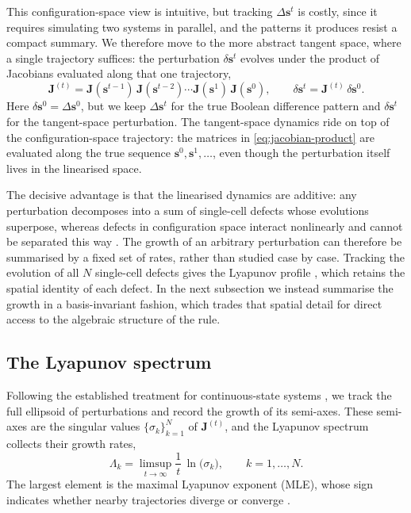 \documentclass[a4paper,fleqn]{cas-dc}
\begin{document}
This configuration-space view is intuitive, but tracking $\Delta\mathbf{s}^t$ is costly, since it requires simulating two systems in parallel, and the patterns it produces resist a compact summary. We therefore move to the more abstract tangent space, where a single trajectory suffices: the perturbation $\delta\mathbf{s}^t$ evolves under the product of Jacobians evaluated along that one trajectory,
\begin{equation}
    \label{eq:jacobian-product}
    \mathbf{J}^{(t)}=\mathbf{J}(\mathbf{s}^{t-1})\,\mathbf{J}(\mathbf{s}^{t-2})
    \cdots\mathbf{J}(\mathbf{s}^1)\,\mathbf{J}(\mathbf{s}^0),
    \qquad \delta\mathbf{s}^t=\mathbf{J}^{(t)}\,\delta\mathbf{s}^0 .
\end{equation}
Here $\delta\mathbf{s}^0=\Delta\mathbf{s}^0$, but we keep $\Delta\mathbf{s}^t$ for the true Boolean difference pattern and $\delta\mathbf{s}^t$ for the tangent-space perturbation. The tangent-space dynamics ride on top of the configuration-space trajectory: the matrices in \eqref{eq:jacobian-product} are evaluated along the true sequence $\mathbf{s}^0,\mathbf{s}^1,\dots$, even though the perturbation itself lives in the linearised space.

The decisive advantage is that the linearised dynamics are additive: any perturbation decomposes into a sum of single-cell defects whose evolutions superpose, whereas defects in configuration space interact nonlinearly and cannot be separated this way \cite{vispoel2024damage}. The growth of an arbitrary perturbation can therefore be summarised by a fixed set of rates, rather than studied case by case. Tracking the evolution of all $N$ single-cell defects gives the Lyapunov profile \cite{baetens2018lyapunov}, which retains the spatial identity of each defect. In the next subsection we instead summarise the growth in a basis-invariant fashion, which trades that spatial detail for direct access to the algebraic structure of the rule.

\subsection{The Lyapunov spectrum}
Following the established treatment for continuous-state systems \cite{eckmann1985ergodic}, we track the full ellipsoid of perturbations and record the growth of its semi-axes. These semi-axes are the singular values $\{\sigma_k\}_{k=1}^N$ of $\mathbf{J}^{(t)}$, and the Lyapunov spectrum collects their growth rates,
\begin{equation}
    \label{eq:lyapunov-spectrum}
    \Lambda_k=\limsup_{t\to\infty}\frac{1}{t}\,\ln\bigl(\sigma_k\bigr),
    \qquad k=1,\dots,N.
\end{equation}
The largest element is the maximal Lyapunov exponent (MLE), whose sign indicates whether nearby trajectories diverge or converge \cite{eckmann1985ergodic}.
\end{document}
